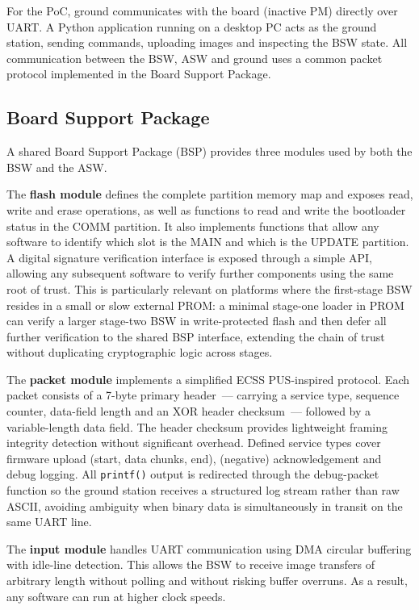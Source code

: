 For the PoC, ground communicates with the board (inactive PM) directly over UART. A Python application running on a desktop PC acts as the ground station, sending commands, uploading images and inspecting the BSW state. All communication between the BSW, ASW and ground uses a common packet protocol implemented in the Board Support Package.

\subsection{Board Support Package}

A shared Board Support Package (BSP) provides three modules used by both the BSW and the ASW.

The \textbf{flash module} defines the complete partition memory map and exposes read, write and erase operations, as well as functions to read and write the bootloader status in the COMM partition. It also implements functions that allow any software to identify which slot is the MAIN and which is the UPDATE partition. A digital signature verification interface is exposed through a simple API, allowing any subsequent software to verify further components using the same root of trust. This is particularly relevant on platforms where the first-stage BSW resides in a small or slow external PROM: a minimal stage-one loader in PROM can verify a larger stage-two BSW in write-protected flash and then defer all further verification to the shared BSP interface, extending the chain of trust without duplicating cryptographic logic across stages.

The \textbf{packet module} implements a simplified ECSS PUS\cite{ECSS-E-ST-70-41C}-inspired protocol. Each packet consists of a 7-byte primary header~--- carrying a service type, sequence counter, data-field length and an XOR header checksum~--- followed by a variable-length data field. The header checksum provides lightweight framing integrity detection without significant overhead. Defined service types cover firmware upload (start, data chunks, end), (negative) acknowledgement and debug logging. All \texttt{printf()} output is redirected through the debug-packet function so the ground station receives a structured log stream rather than raw ASCII, avoiding ambiguity when binary data is simultaneously in transit on the same UART line.

The \textbf{input module} handles UART communication using DMA circular buffering with idle-line detection.
This allows the BSW to receive image transfers of arbitrary length without polling and without risking buffer overruns. As a result, any software can run at higher clock speeds.

